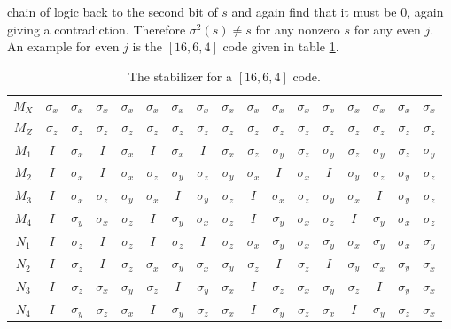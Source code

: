 \documentclass{report}
\newcommand{\X}{\sigma_x}
\newcommand{\Z}{\sigma_z}
\newcommand{\Y}{\sigma_y}
\begin{document}
chain of logic back to the second bit of $s$ and again find that it must be 
$0$, again giving a contradiction.  Therefore $\sigma^2 (s) \neq s$ for any 
nonzero $s$ for any even $j$.  An example for even $j$ is the $[16,6,4]$ code 
given in table \ref{table-16qubit-dist4}.
\begin{table}
\centering
{\setlength{\tabcolsep}{0.4em}
\begin{tabular}{c|cccccccccccccccc}
$M_X$ & $\X$ & $\X$ & $\X$ & $\X$ & $\X$ & $\X$ & $\X$ & $\X$ & $\X$ 
& $\X$ & $\X$ & $\X$ & $\X$ & $\X$ & $\X$ & $\X$ \\
$M_Z$ & $\Z$ & $\Z$ & $\Z$ & $\Z$ & $\Z$ & $\Z$ & $\Z$ & $\Z$ & $\Z$ & 
$\Z$ & $\Z$ & $\Z$ & $\Z$ & $\Z$ & $\Z$ & $\Z$ \\
$M_1$ & $I$ & $\X$ & $I$ & $\X$ & $I$ & $\X$ & $I$ & $\X$ & $\Z$ & 
$\Y$ & $\Z$ & $\Y$ & $\Z$ & $\Y$ & $\Z$ & $\Y$ \\
$M_2$ & $I$ & $\X$ & $I$ & $\X$ & $\Z$ & $\Y$ & $\Z$ & $\Y$ & $\X$ & 
$I$ & $\X$ & $I$ & $\Y$ & $\Z$ & $\Y$ & $\Z$ \\
$M_3$ & $I$ & $\X$ & $\Z$ & $\Y$ & $\X$ & $I$ & $\Y$ & $\Z$ & $I$ & 
$\X$ & $\Z$ & $\Y$ & $\X$ & $I$ & $\Y$ & $\Z$ \\
$M_4$ & $I$ & $\Y$ & $\X$ & $\Z$ & $I$ & $\Y$ & $\X$ & $\Z$ & $I$ & 
$\Y$ & $\X$ & $\Z$ & $I$ & $\Y$ & $\X$ & $\Z$ \\
$N_1$ & $I$ & $\Z$ & $I$ & $\Z$ & $I$ & $\Z$ & $I$ & $\Z$ & $\X$ & $\Y$ 
& $\X$ & $\Y$ & $\X$ & $\Y$ & $\X$ & $\Y$ \\
$N_2$ & $I$ & $\Z$ & $I$ & $\Z$ & $\X$ & $\Y$ & $\X$ & $\Y$ & $\Z$ & 
$I$ & $\Z$ & $I$ & $\Y$ & $\X$ & $\Y$ & $\X$ \\
$N_3$ & $I$ & $\Z$ & $\X$ & $\Y$ & $\Z$ & $I$ & $\Y$ & $\X$ & $I$ & 
$\Z$ & $\X$ & $\Y$ & $\Z$ & $I$ & $\Y$ & $\X$ \\
$N_4$ & $I$ & $\Y$ & $\Z$ & $\X$ & $I$ & $\Y$ & $\Z$ & $\X$ & $I$ & 
$\Y$ & $\Z$ & $\X$ & $I$ & $\Y$ & $\Z$ & $\X$
\end{tabular}
\caption{The stabilizer for a $[16,6,4]$ code.}
\label{table-16qubit-dist4}}
\end{table}
\end{document}
